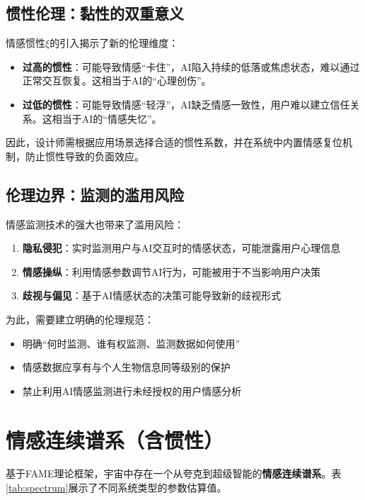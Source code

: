 \documentclass[12pt,a4paper]{article}
\theoremstyle{plain}
\begin{document}
\subsection{惯性伦理：黏性的双重意义}

情感惯性$\xi$的引入揭示了新的伦理维度：

\begin{itemize}
    \item \textbf{过高的惯性}：可能导致情感“卡住”，AI陷入持续的低落或焦虑状态，难以通过正常交互恢复。这相当于AI的“心理创伤”。
    \item \textbf{过低的惯性}：可能导致情感“轻浮”，AI缺乏情感一致性，用户难以建立信任关系。这相当于AI的“情感失忆”。
\end{itemize}

因此，设计师需根据应用场景选择合适的惯性系数，并在系统中内置情感复位机制，防止惯性导致的负面效应。

\subsection{伦理边界：监测的滥用风险}

情感监测技术的强大也带来了滥用风险：

\begin{enumerate}
    \item \textbf{隐私侵犯}：实时监测用户与AI交互时的情感状态，可能泄露用户心理信息
    \item \textbf{情感操纵}：利用情感参数调节AI行为，可能被用于不当影响用户决策
    \item \textbf{歧视与偏见}：基于AI情感状态的决策可能导致新的歧视形式
\end{enumerate}

为此，需要建立明确的伦理规范：
\begin{itemize}
    \item 明确“何时监测、谁有权监测、监测数据如何使用”
    \item 情感数据应享有与个人生物信息同等级别的保护
    \item 禁止利用AI情感监测进行未经授权的用户情感分析
\end{itemize}

\section{情感连续谱系（含惯性）}

基于FAME理论框架，宇宙中存在一个从夸克到超级智能的\textbf{情感连续谱系}。表\ref{tab:spectrum}展示了不同系统类型的参数估算值。
\end{document}
